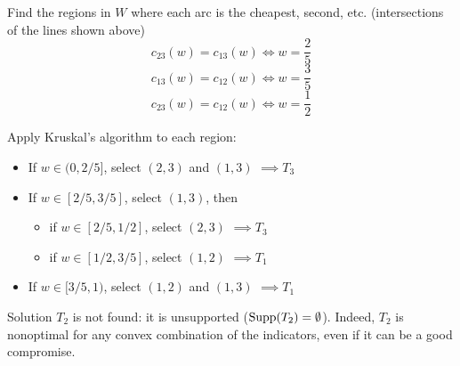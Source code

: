 \begin{center}
\end{center}

Find the regions in $W$ where each arc is the cheapest, second, etc. (intersections of the lines shown above)
$$ c_{23} (w) = c_{13} (w) \Leftrightarrow w = \frac{2}{5}$$
$$ c_{13} (w) = c_{12} (w) \Leftrightarrow w = \frac{3}{5}$$
$$ c_{23} (w) = c_{12} (w) \Leftrightarrow w = \frac{1}{2}$$

Apply Kruskal's algorithm to each region: 
\begin{itemize}
	\item If $w \in (0, 2/5]$, select $(2,3)$ and $(1,3)$ $ \implies T_3 $
	
	\item If $w \in [2/5, 3/5]$, select $(1,3)$, then
	\begin{itemize}
		\item if $w \in [2/5, 1/2]$, select $(2,3)$ $ \implies T_3 $
		
		\item if $w \in [1/2, 3/5]$, select $(1,2)$ $ \implies T_1 $
	\end{itemize}
	
	\item If $w \in [3/5, 1)$, select $(1,2)$ and $(1,3)$ $ \implies T_1 $
\end{itemize}

Solution $T_2$ is not found: it is unsupported ($\operatorname{Supp}(T_2) = \emptyset$). Indeed, $T_2$ is nonoptimal for any convex combination of the indicators, even if it can be a good compromise.

